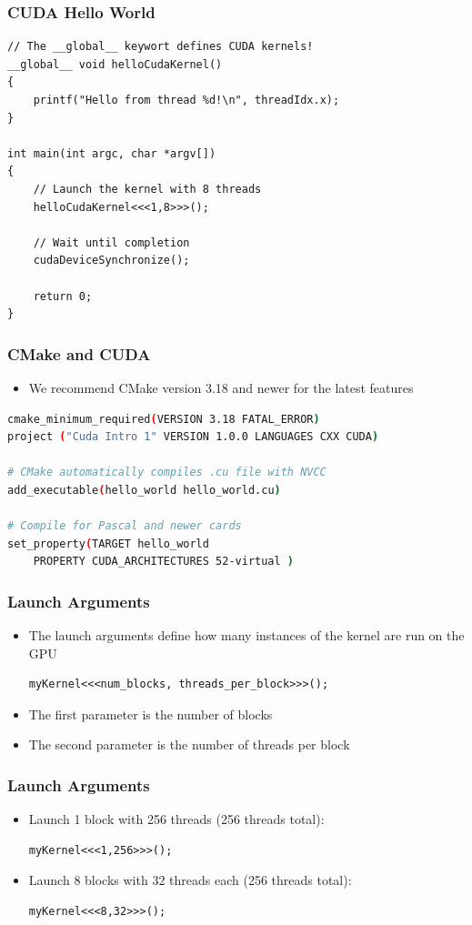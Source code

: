 \documentclass[aspectratio=169]{beamer}
\begin{document}
\begin{frame}[fragile]
\frametitle{CUDA Hello World}
\begin{lstlisting}
// The __global__ keywort defines CUDA kernels!
__global__ void helloCudaKernel()
{
	printf("Hello from thread %d!\n", threadIdx.x);
}

int main(int argc, char *argv[])
{
	// Launch the kernel with 8 threads
	helloCudaKernel<<<1,8>>>();
	
	// Wait until completion
	cudaDeviceSynchronize();
	
	return 0;
}
\end{lstlisting}
\end{frame}

\begin{frame}[fragile]
\frametitle{CMake and CUDA}
	\begin{itemize}
	\item We recommend CMake version 3.18 and newer for the latest features

		\end{itemize}
\begin{lstlisting}[language=bash]
cmake_minimum_required(VERSION 3.18 FATAL_ERROR)
project ("Cuda Intro 1" VERSION 1.0.0 LANGUAGES CXX CUDA)

# CMake automatically compiles .cu file with NVCC
add_executable(hello_world hello_world.cu)

# Compile for Pascal and newer cards
set_property(TARGET hello_world 
	PROPERTY CUDA_ARCHITECTURES 52-virtual )
\end{lstlisting}
\end{frame}




\begin{frame}[fragile]
	\frametitle{Launch Arguments}
	\begin{itemize}
		\item The launch arguments define how many instances of the kernel are run on the GPU
\begin{lstlisting}
myKernel<<<num_blocks, threads_per_block>>>();
\end{lstlisting}
		\item The first parameter is the number of blocks
		\item The second parameter is the number of threads per block
	\end{itemize}
\end{frame}

\begin{frame}[fragile]
	\frametitle{Launch Arguments}
	\begin{itemize}
		\item Launch 1 block with 256 threads (256 threads total):
\begin{lstlisting}
myKernel<<<1,256>>>();
\end{lstlisting}
		\item Launch 8 blocks with 32 threads each (256 threads total):
\begin{lstlisting}
myKernel<<<8,32>>>();
\end{lstlisting}
	\end{itemize}
\end{frame}
\end{document}
